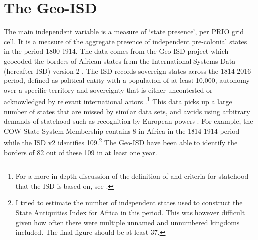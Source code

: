 \documentclass[12pt]{article}
\begin{document}
% 
% 
% 
% 
% 
% 
% 

\section{The Geo-ISD}

The main independent variable is a measure of `state presence', per PRIO grid
cell. It is a measure of the aggregate presence of independent pre-colonial
states in the period 1800-1914. The data comes from the Geo-ISD project which
geocoded the borders of African states from the International Systems Data
(hereafter ISD) version 2 \citep{Butcher2020}. The ISD records sovereign states
across the 1814-2016 period, defined as political entity with a population of at
least 10,000, autonomy over a specific territory and sovereignty that is either
uncontested or acknowledged by relevant international actors
\citep{Butcher2020}.\footnote{For a more in depth discussion of the definition
	of and criteria for statehood that the ISD is based on, see
\citet{Butcher2017}.} This data picks up a large number of states that are
missed by similar data sets, and avoids using arbitrary demands of statehood
such as recognition by European powers \citep{Butcher2020}.  For example, the
COW State System Membership contains 8 in Africa in the 1814-1914 period while
the ISD v2 identifies 109.\footnote{I tried to estimate the number of
	independent states used to construct the State Antiquities Index for
Africa in this period. This was however difficult given how often there were 
multiple unnamed and unnumbered kingdoms included. The final figure
should be at least 37.} The Geo-ISD have been able to identify the borders of 82
out of these 109 in at least one year.
\end{document}

